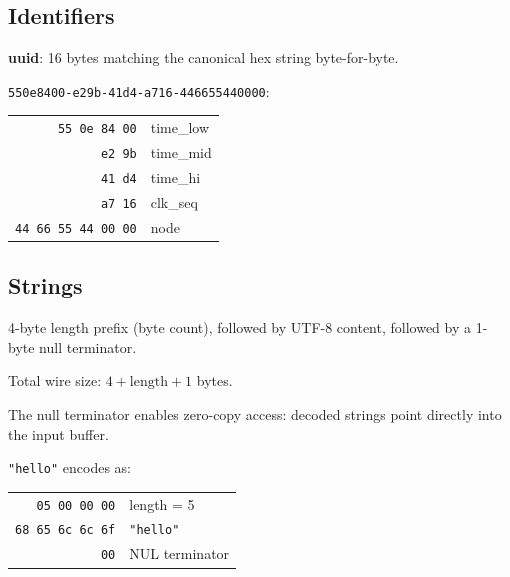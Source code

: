 \documentclass[10pt,onecolumn]{article}
\begin{document}
\subsection{Identifiers}

\begin{minipage}[t]{0.48\textwidth}
\textbf{uuid}: 16 bytes matching the canonical hex string byte-for-byte.
\end{minipage}\hfill
\begin{minipage}[t]{0.48\textwidth}
\small
\texttt{550e8400-e29b-41d4-a716-446655440000}:
\vspace{4pt}

\begin{tabular}[t]{@{}r@{ }l@{}}
\texttt{55 0e 84 00} & time\_low \\
\texttt{e2 9b} & time\_mid \\
\texttt{41 d4} & time\_hi \\
\texttt{a7 16} & clk\_seq \\
\texttt{44 66 55 44 00 00} & node \\
\end{tabular}
\end{minipage}

\subsection{Strings}

\begin{minipage}[t]{0.48\textwidth}
4-byte length prefix (byte count), followed by UTF-8 content, followed by a 1-byte null terminator.

\vspace{6pt}
Total wire size: $4 + \text{length} + 1$ bytes.

\vspace{6pt}
The null terminator enables zero-copy access: decoded strings point directly into the input buffer.
\end{minipage}\hfill
\begin{minipage}[t]{0.48\textwidth}
\small
\texttt{"hello"} encodes as:
\vspace{4pt}

\begin{tabular}[t]{@{}r@{\quad}l@{}}
\texttt{05 00 00 00} & length = 5 \\
\texttt{68 65 6c 6c 6f} & \texttt{"hello"} \\
\texttt{00} & NUL terminator \\
\end{tabular}
\end{minipage}
\end{document}
